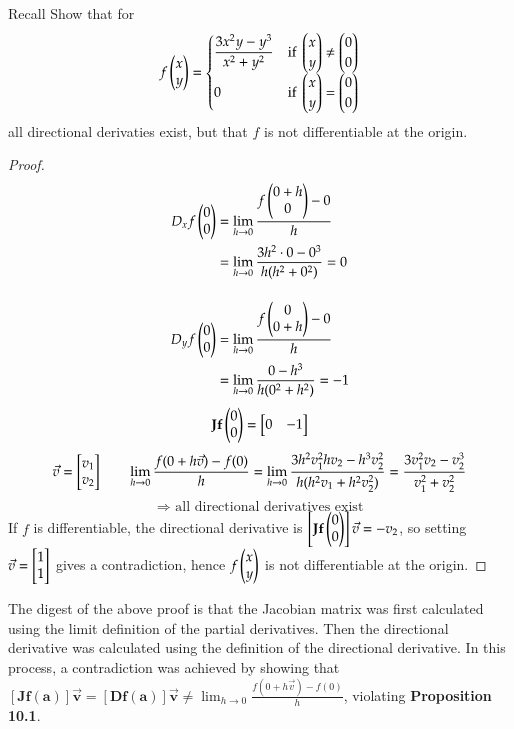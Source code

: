 
Recall
  Show that for
  \[f\begin{pmatrix} x \\ y \end{pmatrix} = \begin{cases}
  \displaystyle \frac{3x^2y - y^3}{x^2+y^2} & \text{if } \begin{pmatrix} x \\ y \end{pmatrix} \neq \begin{pmatrix} 0 \\ 0 \end{pmatrix} \\
  0 & \text{if } \begin{pmatrix} x \\ y \end{pmatrix} = \begin{pmatrix} 0 \\ 0 \end{pmatrix}
  \end{cases}\]
  all directional derivaties exist, but that $f$ is not differentiable at the origin.
  
\begin{proof}
\begin{align*}
  D_xf\begin{pmatrix} 0 \\ 0 \end{pmatrix} &= \lim_{h\to 0} \frac{f\begin{pmatrix} 0 + h \\ 0 \end{pmatrix}-0}{h} \\
  &= \lim_{h\to 0}\frac{3h^2\cdot 0 - 0^3}{h(h^2+0^2)}=0\\[12pt]
  D_yf\begin{pmatrix} 0 \\ 0 \end{pmatrix} &= \lim_{h\to 0} \frac{f\begin{pmatrix} 0 \\ 0+h \end{pmatrix}-0}{h} \\
&= \lim_{h\to 0} \frac{0-h^3}{h(0^2+h^2)}=-1
\end{align*}
\[\textbf{Jf}\begin{pmatrix} 0 \\ 0 \end{pmatrix} = \begin{bmatrix} 0 & -1 \end{bmatrix}\]
\[\vec{v}=\begin{bmatrix} v_1 \\ v_2 \end{bmatrix}\qquad \lim_{h\to 0}\frac{f(0+h\vec{v})-f(0)}{h}=\lim_{h\to 0}\frac{3h^2v_1^2hv_2-h^3v_2^2}{h(h^2v_1+h^2 v_2^2)}=\frac{3v_1^2v_2-v_2^3}{v_1^2+v_2^2}\]
\[\Rightarrow \text{ all directional derivatives exist}\]
If $f$ is differentiable, the directional derivative is $\left[\textbf{Jf}\begin{pmatrix} 0 \\ 0 \end{pmatrix}\right]\vec{v}=-v_2$, so setting $\vec{v}=\begin{bmatrix} 1 \\ 1 \end{bmatrix}$ gives a contradiction, hence $f\begin{pmatrix} x \\ y \end{pmatrix}$ is not differentiable at the origin.
\end{proof}

The digest of the above proof is that the Jacobian matrix was first calculated using the limit definition of the partial derivatives. Then the directional derivative was calculated using the definition of the directional derivative. In this process, a contradiction was achieved by showing that $[\bm{Jf}(\bm{a})]\vec{\bm{v}}=[\bm{Df}(\bm{a})]\vec{\bm{v}}\neq \lim_{h\to 0}\frac{f(0+h\vec{v})-f(0)}{h}$, violating \textbf{Proposition 10.1}. 


